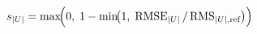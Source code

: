 \documentclass[12pt]{article}
\begin{document}
\begin{equation*}
s_{|U|} = \max\!\Bigl(0,\; 1 - \min\!\bigl(1,\; \text{RMSE}_{|U|}\, /\, \text{RMS}_{|U|,\text{ref}}\bigr)\Bigr)
\end{equation*}
\end{document}
